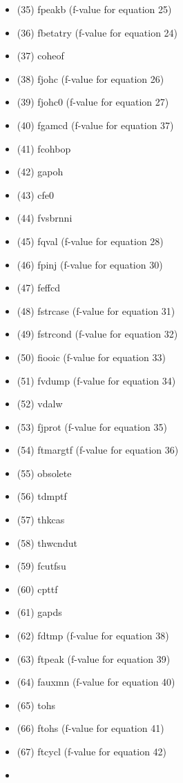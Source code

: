 \documentclass[
]{article}
\begin{document}
\begin{itemize}
\begin{itemize}
  \item
    (35) fpeakb (f-value for equation 25)
  \item
    (36) fbetatry (f-value for equation 24)
  \item
    (37) coheof
  \item
    (38) fjohc (f-value for equation 26)
  \item
    (39) fjohc0 (f-value for equation 27)
  \item
    (40) fgamcd (f-value for equation 37)
  \item
    (41) fcohbop
  \item
    (42) gapoh
  \item
    (43) cfe0
  \item
    (44) fvsbrnni
  \item
    (45) fqval (f-value for equation 28)
  \item
    (46) fpinj (f-value for equation 30)
  \item
    (47) feffcd
  \item
    (48) fstrcase (f-value for equation 31)
  \item
    (49) fstrcond (f-value for equation 32)
  \item
    (50) fiooic (f-value for equation 33)
  \item
    (51) fvdump (f-value for equation 34)
  \item
    (52) vdalw
  \item
    (53) fjprot (f-value for equation 35)
  \item
    (54) ftmargtf (f-value for equation 36)
  \item
    (55) obsolete
  \item
    (56) tdmptf
  \item
    (57) thkcas
  \item
    (58) thwcndut
  \item
    (59) fcutfsu
  \item
    (60) cpttf
  \item
    (61) gapds
  \item
    (62) fdtmp (f-value for equation 38)
  \item
    (63) ftpeak (f-value for equation 39)
  \item
    (64) fauxmn (f-value for equation 40)
  \item
    (65) tohs
  \item
    (66) ftohs (f-value for equation 41)
  \item
    (67) ftcycl (f-value for equation 42)
  \item

\end{itemize}
\end{itemize}
\end{document}
